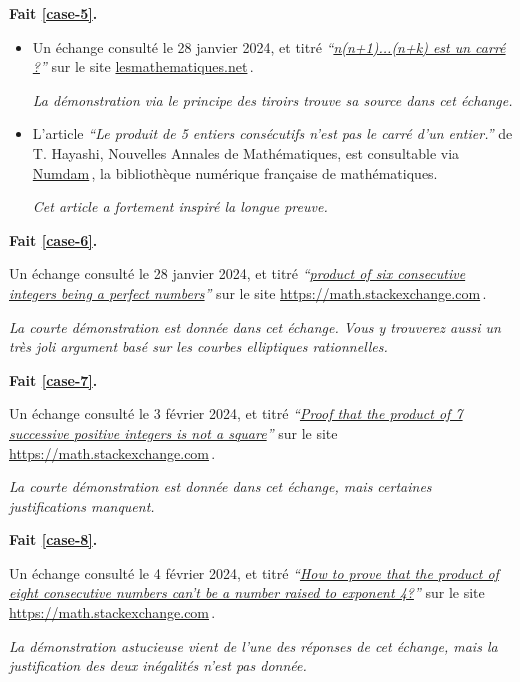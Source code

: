 

\textbf{Fait \ref{case-5}.}
	
\begin{itemize}
	\item Un échange consulté le 28 janvier 2024, et titré 
	\emph{\enquote{\href{https://les-mathematiques.net/vanilla/discussion/comment/351293}{n(n+1)...(n+k) est un carré ?}}} 
	sur le site \url{lesmathematiques.net}\,.

    \smallskip
    \noindent
    \emph{La démonstration via le principe des tiroirs trouve sa source dans cet échange.}


	\item L'article \emph{\enquote{Le produit de 5 entiers consécutifs n'est pas le carré d'un entier.}} de T. Hayashi, Nouvelles Annales de Mathématiques, est consultable via \href{https://numdam.org}{Numdam}\,, la bibliothèque numérique française de mathématiques.
	
	\smallskip
	\noindent
	\emph{Cet article a fortement inspiré la longue preuve.}
\end{itemize}
\vspace{-1ex}




\bigskip
\textbf{Fait \ref{case-6}.}
	
\smallskip
\noindent
Un échange consulté le 28 janvier 2024, et titré
\emph{\enquote{\href{https://math.stackexchange.com/q/90894/52365}{product of six consecutive integers being a perfect numbers}}} 
sur le site \url{https://math.stackexchange.com}\,.
	
\smallskip
\noindent
\emph{La courte démonstration est donnée dans cet échange. Vous y trouverez aussi un très joli argument basé sur les courbes elliptiques rationnelles.}




\bigskip
\textbf{Fait \ref{case-7}.}
	
\smallskip
\noindent
Un échange consulté le 3 février 2024, et titré
\emph{\enquote{\href{https://math.stackexchange.com/q/2334887/52365}{Proof that the product of 7 successive positive integers is not a square}}} 
sur le site \url{https://math.stackexchange.com}\,.
	
\smallskip
\noindent
\emph{La courte démonstration est donnée dans cet échange, mais certaines justifications manquent.}




\bigskip
\textbf{Fait \ref{case-8}.}
	
\smallskip
\noindent
Un échange consulté le 4 février 2024, et titré
\emph{\enquote{\href{https://math.stackexchange.com/a/2271715/52365}{How to prove that the product of eight consecutive numbers can't be a number raised to exponent 4?}}} 
sur le site \url{https://math.stackexchange.com}\,.

\smallskip
\noindent
\emph{La démonstration astucieuse vient de l'une des réponses de cet échange, mais la justification des deux inégalités n'est pas donnée.}

